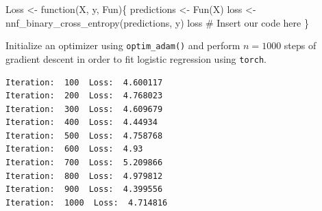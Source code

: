 \documentclass[
  letterpaper,
  DIV=11,
  numbers=noendperiod]{scrartcl}
\newenvironment{Shaded}{\begin{snugshade}}{\end{snugshade}}
\newcommand{\AttributeTok}[1]{\textcolor[rgb]{0.40,0.45,0.13}{#1}}
\newcommand{\CommentTok}[1]{\textcolor[rgb]{0.37,0.37,0.37}{#1}}
\newcommand{\ControlFlowTok}[1]{\textcolor[rgb]{0.00,0.23,0.31}{#1}}
\newcommand{\DecValTok}[1]{\textcolor[rgb]{0.68,0.00,0.00}{#1}}
\newcommand{\FloatTok}[1]{\textcolor[rgb]{0.68,0.00,0.00}{#1}}
\newcommand{\FunctionTok}[1]{\textcolor[rgb]{0.28,0.35,0.67}{#1}}
\newcommand{\NormalTok}[1]{\textcolor[rgb]{0.00,0.23,0.31}{#1}}
\newcommand{\OtherTok}[1]{\textcolor[rgb]{0.00,0.23,0.31}{#1}}
\newcommand{\SpecialCharTok}[1]{\textcolor[rgb]{0.37,0.37,0.37}{#1}}
\newcommand{\StringTok}[1]{\textcolor[rgb]{0.13,0.47,0.30}{#1}}
\begin{document}
\begin{Shaded}
\begin{Highlighting}[]
\NormalTok{Loss }\OtherTok{\textless{}{-}} \ControlFlowTok{function}\NormalTok{(X, y, Fun)\{}
\NormalTok{  predictions }\OtherTok{\textless{}{-}} \FunctionTok{Fun}\NormalTok{(X)}
\NormalTok{  loss }\OtherTok{\textless{}{-}} \FunctionTok{nnf\_binary\_cross\_entropy}\NormalTok{(predictions, y)}
\NormalTok{  loss }\CommentTok{\# Insert our code here}
\NormalTok{\}}
\end{Highlighting}
\end{Shaded}

Initialize an optimizer using \texttt{optim\_adam()} and perform
\(n=1000\) steps of gradient descent in order to fit logistic regression
using \texttt{torch}.

\begin{Shaded}
\end{Shaded}

\begin{verbatim}
Iteration:  100  Loss:  4.600117 
Iteration:  200  Loss:  4.768023 
Iteration:  300  Loss:  4.609679 
Iteration:  400  Loss:  4.44934 
Iteration:  500  Loss:  4.758768 
Iteration:  600  Loss:  4.93 
Iteration:  700  Loss:  5.209866 
Iteration:  800  Loss:  4.979812 
Iteration:  900  Loss:  4.399556 
Iteration:  1000  Loss:  4.714816 
\end{verbatim}
\end{document}
